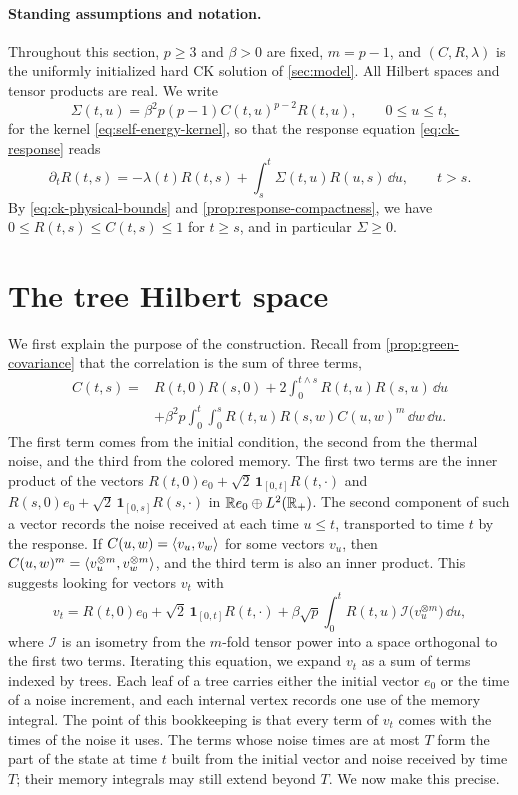 \paragraph{Standing assumptions and notation.}
Throughout this section, $p\ge3$ and $\beta>0$ are fixed, $m=p-1$, and $(C,R,\lambda)$ is the uniformly initialized hard CK solution of \cref{sec:model}. All Hilbert spaces and tensor products are real. We write
\[
 \Sigma(t,u)=\beta^2p(p-1)C(t,u)^{p-2}R(t,u),\qquad 0\le u\le t,
\]
for the kernel \eqref{eq:self-energy-kernel}, so that the response equation \eqref{eq:ck-response} reads
\begin{equation}\label{eq:tree-response-equation}
 \partial_tR(t,s)=-\lambda(t)R(t,s)+\int_s^t\Sigma(t,u)R(u,s)\,\dd u,\qquad t>s.
\end{equation}
By \eqref{eq:ck-physical-bounds} and \cref{prop:response-compactness}, we have $0\le R(t,s)\le C(t,s)\le1$ for $t\ge s$, and in particular $\Sigma\ge0$.

\section{The tree Hilbert space}\label{sec:tree-space}

We first explain the purpose of the construction. Recall from \cref{prop:green-covariance} that the correlation is the sum of three terms,
\[
\begin{aligned}
 C(t,s)={}&R(t,0)R(s,0)+2\int_0^{t\wedge s}R(t,u)R(s,u)\,\dd u\\
 &+\beta^2p\int_0^t\int_0^sR(t,u)R(s,w)C(u,w)^{m}\,\dd w\,\dd u.
\end{aligned}
\]
The first term comes from the initial condition, the second from the thermal noise, and the third from the colored memory. The first two terms are the inner product of the vectors $R(t,0)e_0+\sqrt2\,\mathbf 1_{[0,t]}R(t,\cdot)$ and $R(s,0)e_0+\sqrt2\,\mathbf 1_{[0,s]}R(s,\cdot)$ in $\mathbb R e_0\oplus L^2(\mathbb R_+)$. The second component of such a vector records the noise received at each time $u\le t$, transported to time $t$ by the response. If $C(u,w)=\left\langle v_u,v_w\right\rangle$ for some vectors $v_u$, then $C(u,w)^m=\left\langle v_u^{\otimes m},v_w^{\otimes m}\right\rangle$, and the third term is also an inner product. This suggests looking for vectors $v_t$ with
\[
 v_t=R(t,0)e_0+\sqrt2\,\mathbf 1_{[0,t]}R(t,\cdot)+\beta\sqrt p\int_0^tR(t,u)\mathcal I\bigl(v_u^{\otimes m}\bigr)\,\dd u,
\]
where $\mathcal I$ is an isometry from the $m$-fold tensor power into a space orthogonal to the first two terms. Iterating this equation, we expand $v_t$ as a sum of terms indexed by trees. Each leaf of a tree carries either the initial vector $e_0$ or the time of a noise increment, and each internal vertex records one use of the memory integral. The point of this bookkeeping is that every term of $v_t$ comes with the times of the noise it uses. The terms whose noise times are at most $T$ form the part of the state at time $t$ built from the initial vector and noise received by time $T$; their memory integrals may still extend beyond $T$. We now make this precise.

